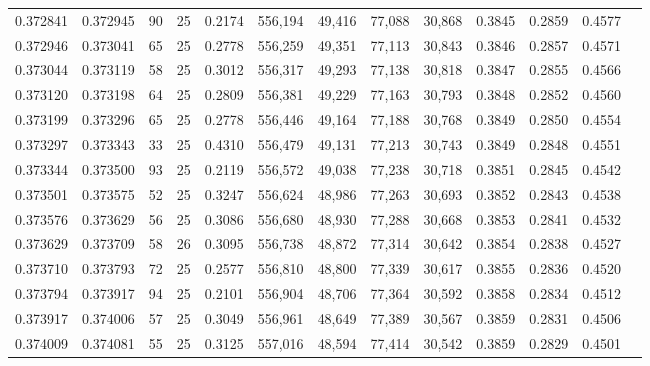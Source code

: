 \begin{tabular}{rrrrrrrrrrrrr}
0.372841 & 0.372945 &    90 &  25 &                                     0.2174 & 556,194 &  49,416 &  77,088 &  30,868 & 0.3845 & 0.2859 & 0.4577 \\
0.372946 & 0.373041 &    65 &  25 &                                     0.2778 & 556,259 &  49,351 &  77,113 &  30,843 & 0.3846 & 0.2857 & 0.4571 \\
0.373044 & 0.373119 &    58 &  25 &                                     0.3012 & 556,317 &  49,293 &  77,138 &  30,818 & 0.3847 & 0.2855 & 0.4566 \\
0.373120 & 0.373198 &    64 &  25 &                                     0.2809 & 556,381 &  49,229 &  77,163 &  30,793 & 0.3848 & 0.2852 & 0.4560 \\
0.373199 & 0.373296 &    65 &  25 &                                     0.2778 & 556,446 &  49,164 &  77,188 &  30,768 & 0.3849 & 0.2850 & 0.4554 \\
0.373297 & 0.373343 &    33 &  25 &                                     0.4310 & 556,479 &  49,131 &  77,213 &  30,743 & 0.3849 & 0.2848 & 0.4551 \\
0.373344 & 0.373500 &    93 &  25 &                                     0.2119 & 556,572 &  49,038 &  77,238 &  30,718 & 0.3851 & 0.2845 & 0.4542 \\
0.373501 & 0.373575 &    52 &  25 &                                     0.3247 & 556,624 &  48,986 &  77,263 &  30,693 & 0.3852 & 0.2843 & 0.4538 \\
0.373576 & 0.373629 &    56 &  25 &                                     0.3086 & 556,680 &  48,930 &  77,288 &  30,668 & 0.3853 & 0.2841 & 0.4532 \\
0.373629 & 0.373709 &    58 &  26 &                                     0.3095 & 556,738 &  48,872 &  77,314 &  30,642 & 0.3854 & 0.2838 & 0.4527 \\
0.373710 & 0.373793 &    72 &  25 &                                     0.2577 & 556,810 &  48,800 &  77,339 &  30,617 & 0.3855 & 0.2836 & 0.4520 \\
0.373794 & 0.373917 &    94 &  25 &                                     0.2101 & 556,904 &  48,706 &  77,364 &  30,592 & 0.3858 & 0.2834 & 0.4512 \\
0.373917 & 0.374006 &    57 &  25 &                                     0.3049 & 556,961 &  48,649 &  77,389 &  30,567 & 0.3859 & 0.2831 & 0.4506 \\
0.374009 & 0.374081 &    55 &  25 &                                     0.3125 & 557,016 &  48,594 &  77,414 &  30,542 & 0.3859 & 0.2829 & 0.4501 \\

\end{tabular}
